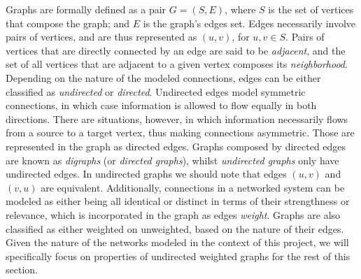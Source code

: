 Graphs are formally defined as a pair $G=(S,E)$, where $S$ is the set of vertices that compose the graph; and $E$ is the graph's edges set. 
%
Edges necessarily involve pairs of vertices, and are thus represented as $(u,v)$, for $u,v \in S$.
Pairs of vertices that are directly connected by an edge are said to be \textit{adjacent}, and the set of all vertices that are adjacent to a given vertex composes its \textit{neighborhood}.
%
Depending on the nature of the modeled connections, edges can be either classified as \textit{undirected} or \textit{directed}.
Undirected edges model symmetric connections, in which case information is allowed to flow equally in both directions.
There are situations, however, in which information necessarily flows from a source to a target vertex, thus making connections asymmetric.
Those are represented in the graph as directed edges.
Graphs composed by directed edges are known as \textit{digraphs} (or \textit{directed graphs}), whilst \textit{undirected graphs} only have undirected edges.
In undirected graphs we should note that edges $(u,v)$ and $(v,u)$ are equivalent.
%
Additionally, connections in a networked system can be modeled as either being all identical or distinct in terms of their strengthness or relevance, which is incorporated in the graph as edges \textit{weight}.
Graphs are also classified as either weighted on unweighted, based on the nature of their edges.
%
Given the nature of the networks modeled in the context of this project, we will specifically focus on properties of undirected weighted graphs for the rest of this section.


